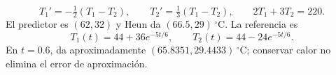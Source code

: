 \[
T_1'=-\tfrac12(T_1-T_2),\qquad T_2'=\tfrac13(T_1-T_2),\qquad 2T_1+3T_2=220.
\]
El predictor es \((62,32)\) y Heun da \((66.5,29)\,{}^\circ\mathrm C\). La referencia es
\[
T_1(t)=44+36e^{-5t/6},\qquad T_2(t)=44-24e^{-5t/6}.
\]
En \(t=0.6\), da aproximadamente \((65.8351,29.4433)\,{}^\circ\mathrm C\); conservar calor no elimina el error de aproximación.
